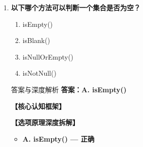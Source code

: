 \documentclass[12pt, a4paper]{ctexart}
\begin{document}
\begin{enumerate}[label=\textbf{\arabic*.}]
\begin{bluebox}{答案与深度解析}
\begin{itemize}[label={}, leftmargin=*, nosep]
\begin{itemize}[label={}, nosep]
			      \item HashMap非线程安全
			      \item Hashtable和ConcurrentHashMap是线程安全的
		      

					  \end{itemize}
		      \item \textbf{D. 基于哈希表实现 — 正确}
					  \begin{itemize}[label={}, nosep]
		      
			      \item JDK8+：数组+链表+红黑树
		      
		      

		      
					  \end{itemize}
					  \end{itemize}
\textbf{【应背诵知识点】}

		      HashMap vs Hashtable：
		      \begin{itemize}[label={}, nosep]
			      \item 线程安全：Hashtable(✓) vs HashMap(✗)
			      \item null支持：HashMap允许null键值，Hashtable不允许
			      \item 性能：HashMap更好
			      \item 迭代器：HashMap用Iterator，Hashtable用Enumeration
		      \end{itemize}
	      \end{bluebox}

	      \vspace{1em}

	\item \textbf{以下哪个方法可以判断一个集合是否为空？}
	      \begin{enumerate}[label=\Alph*.]
		      \item isEmpty()
		      \item isBlank()
		      \item isNullOrEmpty()
		      \item isNotNull()
	      \end{enumerate}

	      \begin{bluebox}{答案与深度解析}
		      \textbf{答案：A. isEmpty()}

		      \textbf{【核心认知框架】}

		      \textbf{【选项原理深度拆解】}
					  \begin{itemize}[label={}, leftmargin=*, nosep]

		      
		      \item \textbf{A. isEmpty() — 正确}
					  \begin{itemize}[label={}, nosep]
		      

\end{itemize}
\end{itemize}
\end{bluebox}
\end{enumerate}
\end{document}
